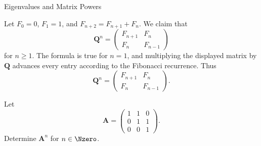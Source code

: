\begin{expectedproblemgroup}{Eigenvalues and Matrix Powers}
        \begin{expectedsubsolution}
            Let $F_0=0$, $F_1=1$, and $F_{n+2}=F_{n+1}+F_n$. We claim that
            \[
                \mathbf{Q}^n
                =
                \begin{pmatrix}
                    F_{n+1} & F_n\\
                    F_n & F_{n-1}
                \end{pmatrix}
            \]
            for $n\geq1$. The formula is true for $n=1$, and multiplying the
            displayed matrix by $\mathbf{Q}$ advances every entry according to the
            Fibonacci recurrence. Thus
            \[
                \boxed{
                    \mathbf{Q}^n
                    =
                    \begin{pmatrix}
                        F_{n+1} & F_n\\
                        F_n & F_{n-1}
                    \end{pmatrix}
                }.
            \]
        \end{expectedsubsolution}


        \begin{expectedsubproblem}
            Let
            \[
                \mathbf{A}
                =
                \begin{pmatrix}
                    1 & 1 & 0\\
                    0 & 1 & 1\\
                    0 & 0 & 1
                \end{pmatrix}.
            \]
            Determine $\mathbf{A}^n$ for $n\in\Nzero$.
        \end{expectedsubproblem}


\end{expectedproblemgroup}
